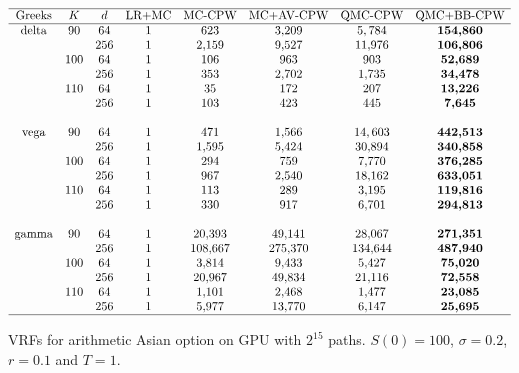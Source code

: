 \begin{table}[!h]
\centering
$\begin{array}{ c c c c c c c c } 
 \hline
 \text{Greeks} & K & d & \text{LR+MC} & \text{MC-CPW} & \text{MC+AV-CPW} & \text{QMC-CPW} & \text{QMC+BB-CPW} \\
 \hline
 \text{delta} & 90  & 64  & 1 & 623     & 3{,}209 & 5,784    & \boldsymbol{154{,}860} \\ 
              &     & 256 & 1 & 2{,}159 & 9{,}527 & 11{,}976 & \boldsymbol{106{,}806} \\
              & 100 & 64  & 1 & 106     & 963     & 903      & \boldsymbol{52{,}689} \\
              &     & 256 & 1 & 353     & 2{,}702 & 1{,}735  & \boldsymbol{34{,}478} \\
              & 110 & 64  & 1 & 35      & 172     & 207      & \boldsymbol{13{,}226} \\
              &     & 256 & 1 & 103     & 423     & 445      & \boldsymbol{7{,}645} \\
 \\
 \text{vega} & 90  & 64  & 1 & 471     & 1{,}566 & 14,603   & \boldsymbol{442{,}513} \\ 
             &     & 256 & 1 & 1{,}595 & 5{,}424 & 30{,}894 & \boldsymbol{340{,}858} \\
             & 100 & 64  & 1 & 294     & 759     & 7{,}770  & \boldsymbol{376{,}285} \\
             &     & 256 & 1 & 967     & 2{,}540 & 18{,}162 & \boldsymbol{633{,}051} \\
             & 110 & 64  & 1 & 113     & 289     & 3{,}195  & \boldsymbol{119{,}816} \\
             &     & 256 & 1 & 330     & 917     & 6{,}701  & \boldsymbol{294{,}813} \\
 \\
 \text{gamma} & 90  & 64  & 1 & 20{,}393  & 49{,}141  & 28{,}067  & \boldsymbol{271{,}351} \\ 
              &     & 256 & 1 & 108{,}667 & 275{,}370 & 134{,}644 & \boldsymbol{487{,}940} \\
              & 100 & 64  & 1 & 3{,}814   & 9{,}433   & 5{,}427   & \boldsymbol{75{,}020} \\
              &     & 256 & 1 & 20{,}967  & 49{,}834  & 21{,}116  & \boldsymbol{72{,}558} \\
              & 110 & 64  & 1 & 1{,}101   & 2{,}468   & 1{,}477   & \boldsymbol{23{,}085} \\
              &     & 256 & 1 & 5{,}977   & 13{,}770  & 6{,}147   & \boldsymbol{25{,}695} \\
 \hline
\end{array}$
\caption{VRFs for arithmetic Asian option on GPU with $2^{15}$ paths. $S(0) = 100$, $\sigma = 0.2$, $r = 0.1$ and $T = 1$.}
\label{tbl:vrfs-arithmetic}
\end{table}

